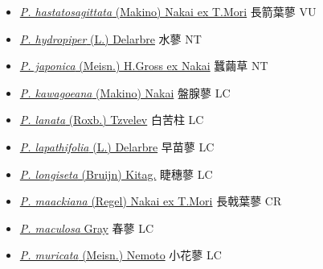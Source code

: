 \begin{itemize}
\begin{itemize}
        \item[] \href{http://www.theplantlist.org/tpl1.1/search?q=Persicaria+hastatosagittata}{\textit{P. hastatosagittata} (Makino) Nakai ex T.Mori}   長箭葉蓼   VU
        \item[] \href{http://www.theplantlist.org/tpl1.1/search?q=Persicaria+hydropiper}{\textit{P. hydropiper} (L.) Delarbre}   水蓼   NT
        \item[] \href{http://www.theplantlist.org/tpl1.1/search?q=Persicaria+japonica}{\textit{P. japonica} (Meisn.) H.Gross ex Nakai}   蠶繭草   NT
        \item[] \href{http://www.theplantlist.org/tpl1.1/search?q=Persicaria+kawagoeana}{\textit{P. kawagoeana} (Makino) Nakai}   盤腺蓼   LC
        \item[] \href{http://www.theplantlist.org/tpl1.1/search?q=Persicaria+lanata}{\textit{P. lanata} (Roxb.) Tzvelev}   白苦柱   LC
        \item[] \href{http://www.theplantlist.org/tpl1.1/search?q=Persicaria+lapathifolia}{\textit{P. lapathifolia} (L.) Delarbre}   早苗蓼   LC
        \item[] \href{http://www.theplantlist.org/tpl1.1/search?q=Persicaria+longiseta}{\textit{P. longiseta} (Bruijn) Kitag.}   睫穗蓼   LC
        \item[] \href{http://www.theplantlist.org/tpl1.1/search?q=Persicaria+maackiana}{\textit{P. maackiana} (Regel) Nakai ex T.Mori}   長戟葉蓼   CR
        \item[] \href{http://www.theplantlist.org/tpl1.1/search?q=Persicaria+maculosa}{\textit{P. maculosa} Gray}   春蓼   LC
        \item[] \href{http://www.theplantlist.org/tpl1.1/search?q=Persicaria+muricata}{\textit{P. muricata} (Meisn.) Nemoto}   小花蓼   LC

\end{itemize}
\end{itemize}
